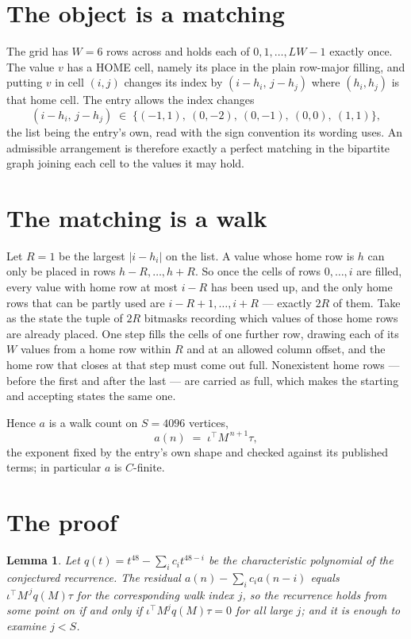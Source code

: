 \documentclass[11pt,a4paper]{article}
\theoremstyle{plain}
\newtheorem{lemma}[theorem]{Lemma}
\theoremstyle{definition}
\begin{document}
\section{The object is a matching}

The grid has $W=6$ rows across and holds each of $0,1,\dots,LW-1$ exactly once. The value
$v$ has a HOME cell, namely its place in the plain row-major filling, and putting $v$ in cell
$(i,j)$ changes its index by $(i-h_i,\,j-h_j)$ where $(h_i,h_j)$ is that home cell. The entry
allows the index changes
\[
(i-h_i,\,j-h_j)\;\in\;\{(-1,1),\ (0,-2),\ (0,-1),\ (0,0),\ (1,1)\},
\]
the list being the entry's own, read with the sign convention its wording uses. An admissible
arrangement is therefore exactly a perfect matching in the bipartite graph joining each cell to
the values it may hold.

\section{The matching is a walk}

Let $R=1$ be the largest $|i-h_i|$ on the list. A value whose home row is $h$ can only be
placed in rows $h-R,\dots,h+R$. So once the cells of rows $0,\dots,i$ are filled, every
value with home row at most $i-R$ has been used up, and the only home rows that can be
partly used are $i-R+1,\dots,i+R$ --- exactly $2R$ of them. Take as the state the tuple of
$2R$ bitmasks recording which values of those home rows are already placed. One step fills
the cells of one further row, drawing each of its $W$ values from a home row within $R$
and at an allowed column offset, and the home row that closes at that step must come out
full. Nonexistent home rows --- before the first and after the last --- are carried as
full, which makes the starting and accepting states the same one.

Hence $a$ is a walk count on $S=4096$ vertices,
\[
a(n)\;=\;\iota^{\!\top}M^{\,n+1}\tau ,
\]
the exponent fixed by the entry's own shape and checked against its published terms; in
particular $a$ is $C$-finite.

\section{The proof}

\begin{lemma}\label{lem:crit}
Let $q(t)=t^{48}-\sum_i c_it^{48-i}$ be the characteristic polynomial of the
conjectured recurrence. The residual $a(n)-\sum_ic_ia(n-i)$ equals
$\iota^{\!\top}M^{\,j}q(M)\tau$ for the corresponding walk index $j$, so the recurrence
holds from some point on if and only if $\iota^{\!\top}M^{j}q(M)\tau=0$ for all large $j$;
and it is enough to examine $j<S$.
\end{lemma}
\end{document}
